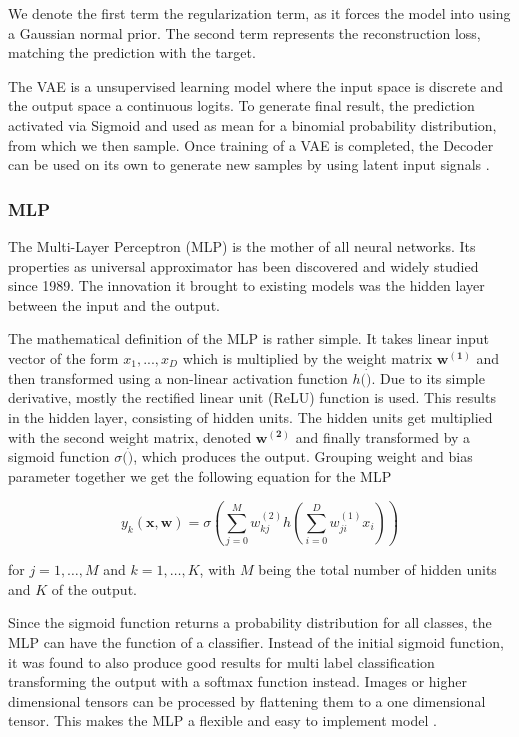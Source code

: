 We denote the first term the regularization term, as it forces the model into using a Gaussian normal prior. The second term represents the reconstruction loss, matching the prediction with the target.

The VAE is a unsupervised learning model where the input space is discrete and the output space a continuous logits. To generate final result, the prediction activated via Sigmoid and used as mean for a binomial probability distribution, from which we then sample. Once training  of a VAE is completed, the Decoder can be used on its own to generate new samples by using latent input signals \cite{kingma_auto-encoding_2014}.


\subsubsection{MLP}
\label{ssec:mlp}
The Multi-Layer Perceptron (MLP) is the mother of all neural networks.
Its properties as universal approximator has been discovered and widely studied since 1989. The innovation it brought to existing models was the hidden layer between the input and the output.

The mathematical definition of the MLP is rather simple. It takes linear input vector of the form $x_1,...,x_D$ which is multiplied by the weight matrix $\mathbf{w^{(1)}}$ and then transformed using a non-linear activation function $h(\dot)$. Due to its simple derivative, mostly the rectified linear unit (ReLU) function is used. This results in the hidden layer, consisting of hidden units. The hidden units get multiplied with the second weight matrix, denoted $\mathbf{w^{(2)}}$ and finally transformed by a sigmoid function $\sigma(\dot)$, which produces the output. Grouping weight and bias parameter together we get the following equation for the MLP

\begin{equation}
    y_{k}(\mathbf{x}, \mathbf{w})=\sigma\left(\sum_{j=0}^{M} w_{k j}^{(2)} h\left(\sum_{i=0}^{D} w_{j i}^{(1)} x_{i}\right)\right)
\end{equation}

for $j=1, \ldots, M$ and $k=1, \ldots, K$, with $M$ being the total number of hidden units and $K$ of the output.


Since the sigmoid function returns a probability distribution for all classes, the MLP can have the function of a classifier. Instead of the initial sigmoid function, it was found to also produce good results for multi label classification transforming the output with a softmax function instead. Images or higher dimensional tensors can be processed by flattening them to a one dimensional tensor. This makes the MLP a flexible and easy to implement model \cite{bishop_pattern_2006}.


